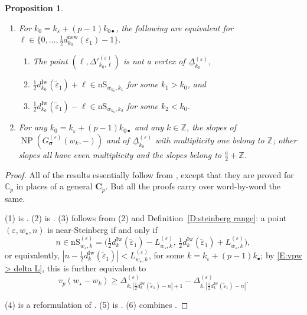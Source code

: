 \documentclass[12pt]{amsart}
\newtheorem{proposition}[subsection]{Proposition}
\theoremstyle{definition}
\numberwithin{equation}{subsection}
\def\CC{\mathbb{C}}
\def\ZZ{\mathbb{Z}}
\def\bfC{\mathbf{C}}
\DeclareMathOperator{\NP}{NP}
\newcommand{\bbsigma}{\boldsymbol{\sigma}}
\newcommand{\new}{\mathrm{new}}
\newcommand{\Iw}{\mathrm{Iw}}
\newcommand{\nS}{\mathrm{nS}}
\begin{document}
\begin{proposition}
\begin{enumerate}
A near-Steinberg range $\nS^{(\varepsilon)}_{w_\star, k}$ is called \emph{maximal} if it is not contained in other near-Steinberg ranges.
Over a maximal  near-Steinberg range, the slope of $\NP(G_{\bbsigma}^{(\varepsilon)}(w_\star, -))$ belongs to
\begin{equation}
\label{E:possible slopes}
\tfrac a2+\ZZ + \ZZ \big( \max\{ v_p(w_\star - w_{k'})| w_{k'} \text{~is a zero of~} g_n^{(\varepsilon)}(w) \text{~for some~} n\in \nS^{(\varepsilon)}_{w_\star,k}  \} \big) .
\end{equation}
\item For ${k_0} = k_\varepsilon + (p-1)k_{0\bullet}$, the following are equivalent for $\ell \in\{0, \dots, \frac12d_{k_0}^\new(\varepsilon_1)-1\}$.
\begin{enumerate}
\item 
The point $(\ell, \Delta'^{(\varepsilon)}_{{k_0},\ell})$ is not a vertex of $\underline \Delta_{k_0}^{(\varepsilon)}$,
\item $\frac 12d_{k_0}^\Iw(\tilde \varepsilon_1) + \ell \in \nS_{ w_{k_0}, k_1}$ for some  $k_1 > {k_0}$, and
\item 
$\frac 12d_{k_0}^\Iw(\tilde \varepsilon_1) - \ell \in \nS_{ w_{k_0}, k_2}$ for some  $k_2 < {k_0}$.
\end{enumerate}

\item For any ${k_0} = k_\varepsilon + (p-1)k_{0\bullet}$ and any $k \in \ZZ$, the slopes of $\NP(G_{\bbsigma}^{(\varepsilon)}(w_k, -))$ and of $\underline\Delta^{(\varepsilon)}_{k_0}$ with multiplicity one belong to $\ZZ$; other slopes all have even multiplicity and the slopes belong to $\frac a2 + \ZZ$.
\end{enumerate}
\end{proposition}
\begin{proof}
All of the results essentially follow from \cite{liu-truong-xiao-zhao}, except that they are proved for $\CC_p$ in places of a general $\bfC_p$. But all the proofs carry over word-by-word the same.

(1) is \cite[Proposition~5.16(1)]{liu-truong-xiao-zhao}. (2) is \cite[Theorem~5.19(2)]{liu-truong-xiao-zhao}. (3) follows from (2) and Definition~\ref{D:steinberg range}: a point $(\varepsilon, w_\star,n)$ is near-Steinberg if and only if $$n \in \nS_{w_\star, k}^{(\varepsilon)} =\big(\tfrac 12 d_k^\Iw(\tilde \varepsilon_1) - L^{(\varepsilon)}_{w_\star, k}, \,\tfrac 12 d_k^\Iw(\tilde \varepsilon_1) + L^{(\varepsilon)}_{w_\star, k} \big), $$ or equivalently, $|n-\frac 12 d_k^\Iw(\tilde \varepsilon_1) | < L^{(\varepsilon)}_{w_\star, k}$, for some $k =k_\varepsilon+(p-1)k_\bullet$; by \eqref{E:vpw > delta L}, this is further equivalent to
$$
v_p(w_\star-w_k) \geq \Delta^{(\varepsilon)}_{k, |\frac 12d_k^\Iw(\tilde \varepsilon_1)-n|+1} - \Delta^{(\varepsilon)}_{k, |\frac 12d_k^\Iw(\tilde \varepsilon_1)-n|}.
$$


(4) is a reformulation of \cite[Theorem~5.19(1)(3)]{liu-truong-xiao-zhao}. (5) is \cite[Proposition~5.26]{liu-truong-xiao-zhao}. (6) combines \cite[Corollary~5.24 and Proposition~5.26]{liu-truong-xiao-zhao}.
\end{proof}
\end{document}
